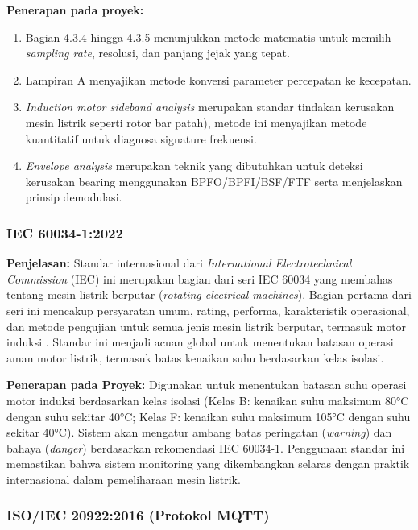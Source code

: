 \documentclass{elsinta}
\begin{document}
\textbf{Penerapan pada proyek:}
\begin{enumerate}
    \item Bagian 4.3.4 hingga 4.3.5 menunjukkan metode matematis untuk memilih \textit{sampling rate}, resolusi, dan panjang jejak yang tepat.
    \item Lampiran A menyajikan metode konversi parameter percepatan ke kecepatan.
    \item \textit{Induction motor sideband analysis} merupakan standar tindakan kerusakan mesin listrik seperti rotor bar patah),  metode ini menyajikan metode kuantitatif untuk diagnosa signature frekuensi.
    \item \textit{Envelope analysis} merupakan teknik yang dibutuhkan untuk deteksi kerusakan bearing menggunakan BPFO/BPFI/BSF/FTF serta menjelaskan prinsip demodulasi.
\end{enumerate}

\subsubsection{IEC 60034-1:2022}

\textbf{Penjelasan:} 
Standar internasional dari \textit{International Electrotechnical Commission} (IEC) ini merupakan bagian dari seri IEC 60034 yang membahas tentang mesin listrik berputar (\textit{rotating electrical machines}). Bagian pertama dari seri ini mencakup persyaratan umum, rating, performa, karakteristik operasional, dan metode pengujian untuk semua jenis mesin listrik berputar, termasuk motor induksi \cite{iec60034_2022}. Standar ini menjadi acuan global untuk menentukan batasan operasi aman motor listrik, termasuk batas kenaikan suhu berdasarkan kelas isolasi.

\textbf{Penerapan pada Proyek:} Digunakan untuk menentukan batasan suhu operasi motor induksi berdasarkan kelas isolasi (Kelas B: kenaikan suhu maksimum 80°C dengan suhu sekitar 40°C; Kelas F: kenaikan suhu maksimum 105°C dengan suhu sekitar 40°C). Sistem akan mengatur ambang batas peringatan (\textit{warning}) dan bahaya (\textit{danger}) berdasarkan rekomendasi IEC 60034-1. Penggunaan standar ini memastikan bahwa sistem monitoring yang dikembangkan selaras dengan praktik internasional dalam pemeliharaan mesin listrik.

\subsubsection{ISO/IEC 20922:2016 (Protokol MQTT)}
\end{document}
